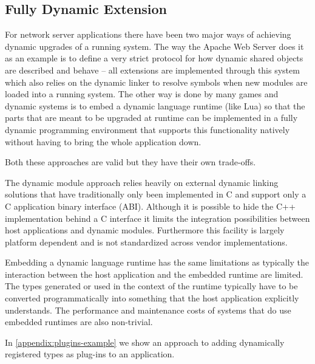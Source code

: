 \subsection{Fully Dynamic Extension}

For network server applications there have been two major ways of achieving
dynamic upgrades of a running system. The way the Apache Web Server does it as
an example is to define a very strict protocol for how dynamic shared objects
are described and behave -- all extensions are implemented through this system
which also relies on the dynamic linker to resolve symbols when new modules
are loaded into a running system. The other way is done by many games and
dynamic systems is to embed a dynamic language runtime (like Lua) so that the
parts that are meant to be upgraded at runtime can be implemented in a fully
dynamic programming environment that supports this functionality natively
without having to bring the whole application down.

Both these approaches are valid but they have their own trade-offs.

The dynamic module approach relies heavily on external dynamic linking
solutions that have traditionally only been implemented in C and support only
a C application binary interface (ABI). Although it is possible to hide the
C++ implementation behind a C interface it limits the integration
possibilities between host applications and dynamic modules. Furthermore this
facility is largely platform dependent and is not standardized across vendor
implementations.

Embedding a dynamic language runtime has the same limitations as typically the
interaction between the host application and the embedded runtime are limited.
The types generated or used in the context of the runtime typically have to be
converted programmatically into something that the host application explicitly
understands. The performance and maintenance costs of systems that do use
embedded runtimes are also non-trivial.

In \autoref{appendix:plugins-example} we show an approach to adding
dynamically registered types as plug-ins to an application.
